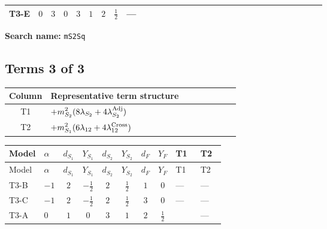 \documentclass[8pt]{article}
\begin{document}
\begin{landscape}
\begin{longtable}{@{}llcccccc >{\raggedright\arraybackslash}p{0.21\linewidth} >{\raggedright\arraybackslash}p{0.21\linewidth} >{\raggedright\arraybackslash}p{0.21\linewidth}@{}}
\midrule
T3-E & $0$ & $3$ & $0$ & $3$ & $1$ & $2$ & $\frac{1}{2}$ & --- & \scriptsize\adjustbox{max width=\linewidth}{$\begin{gathered} -12 {g_2}^2 {m_{S_2}^2}\end{gathered}$} & \scriptsize\adjustbox{max width=\linewidth}{$\begin{gathered} -6 {g_Y}^2 {m_{S_2}^2}\end{gathered}$} \\
\midrule
\bottomrule
\end{longtable}
\clearpage
\noindent\textbf{Search name: }\texttt{mS2Sq}\par\smallskip
\subsection*{Terms 3 of 3}
\begin{center}
\begin{tabular}{@{}c >{\raggedright\arraybackslash}p{0.82\linewidth}@{}}
\toprule
Column & Representative term structure \\
\midrule
T1 & \(\displaystyle +{m_{S_2}^2} (8 {\lambda_{S_2}}+4 {\lambda_{S_2}^{\rm Adj}})\) \\
\midrule
T2 & \(\displaystyle +{m_{S_1}^2} (6 {\lambda_{12}}+4 {\lambda_{12}^{\rm Cross}})\) \\
\midrule
\bottomrule
\end{tabular}
\end{center}
\smallskip
\tiny
\begin{longtable}{@{}llcccccc >{\raggedright\arraybackslash}p{0.21\linewidth} >{\raggedright\arraybackslash}p{0.21\linewidth}@{}}
\toprule
Model & $\alpha$ & $d_{S_1}$ & $Y_{S_1}$ & $d_{S_2}$ & $Y_{S_2}$ & $d_F$ & $Y_F$ & T1 & T2 \\
\midrule
\endfirsthead
\toprule
Model & $\alpha$ & $d_{S_1}$ & $Y_{S_1}$ & $d_{S_2}$ & $Y_{S_2}$ & $d_F$ & $Y_F$ & T1 & T2 \\
\midrule
\endhead
T3-B & $-1$ & $2$ & $-\frac{1}{2}$ & $2$ & $\frac{1}{2}$ & $1$ & $0$ & --- & --- \\
\midrule
T3-C & $-1$ & $2$ & $-\frac{1}{2}$ & $2$ & $\frac{1}{2}$ & $3$ & $0$ & --- & --- \\
\midrule
T3-A & $0$ & $1$ & $0$ & $3$ & $1$ & $2$ & $\frac{1}{2}$ & \scriptsize\adjustbox{max width=\linewidth}{$\begin{gathered} +{m_{S_2}^2} (8 {\lambda_{S_2}}+4 {\lambda_{S_2}^{\rm Adj}})\end{gathered}$} & --- \\

\end{longtable}
\end{landscape}
\end{document}
